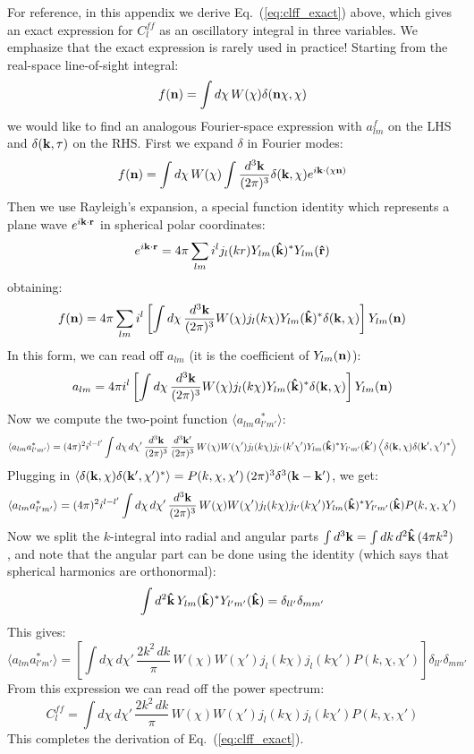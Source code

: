 \documentclass[aps,prd,superscriptaddress,groupedaddress,nofootinbib,nobibnotes]{revtex4}
\newcommand{\be}{\begin{equation}}
\newcommand{\ee}{\end{equation}}
\def\n{{\bf n}}
\def\k{{\bf k}}
\def\r{{\bf r}}
\def\hr{{\bf \hat r}}
\def\hk{{\bf \hat k}}
\begin{document}
For reference, in this appendix we derive Eq.~(\ref{eq:clff_exact}) above, which
gives an exact expression for $C_l^{ff}$ as an oscillatory integral in three variables.
We emphasize that the exact expression is rarely used in practice!
Starting from the real-space line-of-sight integral:
\be
f(\n) = \int d\chi \, W(\chi) \delta(\n\chi,\chi)
\ee
we would like to find an analogous Fourier-space expression with $a_{lm}^f$ on the LHS and $\delta(\k,\tau)$
on the RHS.  First we expand $\delta$ in Fourier modes:
\be
f(\n) = \int d\chi \, W(\chi) \int \frac{d^3\k}{(2\pi)^3} \delta(\k,\chi) e^{i\k\cdot(\chi\n)}
\ee
Then we use Rayleigh's expansion, a special function identity which represents a plane wave $e^{i\k\cdot\r}$
in spherical polar coordinates:
\be
e^{i\k\cdot\r} = 4\pi \sum_{lm} i^l j_l(kr) Y_{lm}(\hk)^* Y_{lm}(\hr)
\ee
obtaining:
\be
f(\n) = 4\pi \sum_{lm} i^l \left[ \int d\chi \, \frac{d^3\k}{(2\pi)^3} W(\chi) j_l(k\chi) Y_{lm}(\hk)^* \delta(\k,\chi) \right] Y_{lm}(\n)
\ee
In this form, we can read off $a_{lm}$ (it is the coefficient of $Y_{lm}(\n)$):
\be
a_{lm} = 4\pi i^l \left[ \int d\chi \, \frac{d^3\k}{(2\pi)^3} W(\chi) j_l(k\chi) Y_{lm}(\hk)^* \delta(\k,\chi) \right] Y_{lm}(\n)
\ee
Now we compute the two-point function $\langle a_{lm} a_{l'm'}^* \rangle$:
\be
\langle a_{lm} a_{l'm'}^* \rangle = (4\pi)^2 i^{l-l'} \int d\chi \, d\chi' \, \frac{d^3\k}{(2\pi)^3} \, \frac{d^3\k'}{(2\pi)^3} \,
   W(\chi) W(\chi') j_l(k\chi) j_{l'}(k'\chi') Y_{lm}(\hk)^* Y_{l'm'}(\hk') \, \Big\langle \delta(\k,\chi) \delta(\k',\chi')^* \Big\rangle
\ee
Plugging in $\langle \delta(\k,\chi) \delta(\k',\chi')^* \rangle = P(k,\chi,\chi') \, (2\pi)^3 \delta^3(\k-\k')$, we get:
\be
\langle a_{lm} a_{l'm'}^* \rangle = (4\pi)^2 i^{l-l'} \int d\chi \, d\chi' \, \frac{d^3\k}{(2\pi)^3} \,
   W(\chi) W(\chi') j_l(k\chi) j_{l'}(k\chi') Y_{lm}(\hk)^* Y_{l'm'}(\hk) P(k,\chi,\chi')
\ee
Now we split the $k$-integral into radial and angular parts $\int d^3\k = \int dk \, d^2\hk \, (4\pi k^2)$, and note that the
angular part can be done using the identity (which says that spherical harmonics are orthonormal):
\be
\int d^2\hk \, Y_{lm}(\hk)^* Y_{l'm'}(\hk) = \delta_{ll'} \delta_{mm'}
\ee
This gives:
\be
\langle a_{lm} a_{l'm'}^* \rangle = \left[ \int d\chi \, d\chi' \, \frac{2k^2 \, dk}{\pi} \,
   W(\chi) W(\chi') j_l(k\chi) j_l(k\chi') P(k,\chi,\chi') \right] \delta_{ll'} \delta_{mm'}
\ee
From this expression we can read off the power spectrum:
\be
C_l^{ff} = \int d\chi \, d\chi' \, \frac{2k^2 \, dk}{\pi} \, W(\chi) W(\chi') j_l(k\chi) j_l(k\chi') P(k,\chi,\chi')
\ee
This completes the derivation of Eq.~(\ref{eq:clff_exact}).
\end{document}
